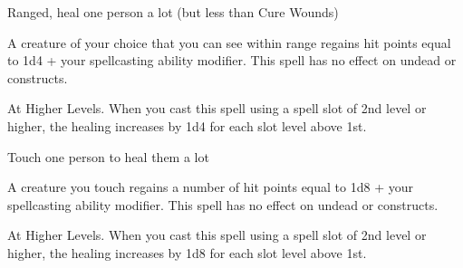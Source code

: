 \documentclass{article}
\begin{document}
\begin{abilitycategory}

    \begin{spell}
        \begin{abilityusage}
            Ranged, heal one person a lot (but less than Cure Wounds)
        \end{abilityusage}
        \begin{spelldescription}
            A creature of your choice that you can see within range regains hit
            points equal to 1d4 + your spellcasting ability modifier. This spell
            has no effect on undead or constructs.

            At Higher Levels. When you cast this spell using a spell slot of
            2nd level or higher, the healing increases by 1d4 for each slot
            level above 1st.
        \end{spelldescription}
    \end{spell}

    \begin{spell}
        \begin{abilityusage}
            Touch one person to heal them a lot
        \end{abilityusage}
        \begin{spelldescription}
            A creature you touch regains a number of hit points equal to 1d8 +
            your spellcasting ability modifier. This spell has no effect on
            undead or constructs.

            At Higher Levels. When you cast this spell using a spell slot of
            2nd level or higher, the healing increases by 1d8 for each slot
            level above 1st.
        \end{spelldescription}
    \end{spell}
\end{abilitycategory}

\render
\end{document}
